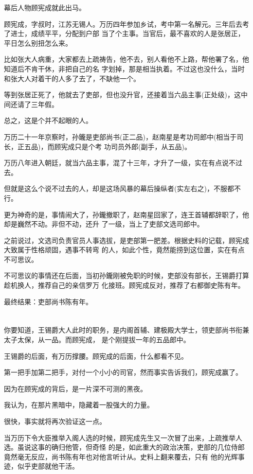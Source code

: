 \documentclass[11pt,a4paper,onecolumn]{article}
\begin{document}
幕后人物顾宪成就此出马。

顾宪成，字叔时，江苏无锡人。万历四年参加乡试，考中第一名解元。三年后去考了进士，成绩平平，分配到户部
当了个主事。当官后，最不喜欢的人是张居正，平日怎么别扭怎么来。

比如张大人病重，大家都去上疏祷告，他不去，别人看他不上路，帮他署了名，他知道后不肯干休，非把自己的名
字划掉，那是相当执着。不过这也没什么，当时和张大人对着干的人多了去了，不缺他一个。

等到张居正死了，他就去了吏部，但也没升官，还接着当六品主事(正处级)，这中间还请了三年假。

总之，这是个并不起眼的人。

万历二十一年京察时，孙鑨是吏部尚书(正二品)，赵南星是考功司郎中(相当于司长，正五品)，而顾宪成只是个考
功司员外郎(副手，从五品)。

万历八年进入朝廷，就当六品主事，混了十三年，才升了一级，实在有点说不过去。

但就是这么个说不过去的人，却是这场风暴的幕后操纵者(实左右之)，不服都不行。

更为神奇的是，事情闹大了，孙鑨撤职了，赵南星回家了，连王首辅都辞职了，他却是巍然不动。非但不动，还升
了一级，当上了吏部文选司郎中。

之前说过，文选司负责官员人事选拔，是吏部第一肥差。根据史料的记载，顾宪成大致属于性格顽固，遇事不转弯
的人，如此个性，竟然能捞到这位置，实在有点不可思议。

不可思议的事情还在后面，当初孙鑨刚被免职的时候，吏部没有部长，王锡爵打算趁机换人，推荐自己的亲信罗万
化接班。顾宪成反对，推荐了右都御史陈有年。

最终结果：吏部尚书陈有年。

\section[\thesection]{}

你要知道，王锡爵大人此时的职务，是内阁首辅、建极殿大学士，领吏部尚书衔兼太子太保，从一品。而顾宪成，
是个刚提拔一年的五品郎中。

王锡爵的后面，有万历撑腰。顾宪成的后面，什么都看不见。

第一把手加第二把手，对付一个小小的司官，然而事实告诉我们，顾宪成赢了。

因为在顾宪成的背后，是一片深不可测的黑夜。

我认为，在那片黑暗中，隐藏着一股强大的力量。

很快，事实就将再次验证这一点。

当万历下令大臣推举入阁人选的时候，顾宪成先生又一次冒了出来，上疏推举人选。虽说这事的确归他管，但奇怪
的是，如此重大的政治决策，吏部的几位侍郎竟然毫无反应，尚书陈有年也对他言听计从。史料上翻来覆去，只有
他的光辉事迹，似乎吏部就他干活。
\end{document}
